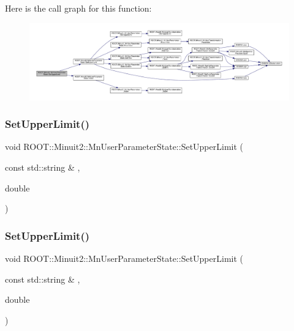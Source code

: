 Here is the call graph for this function\+:
\nopagebreak
\begin{figure}[H]
\begin{center}
\leavevmode
\includegraphics[width=350pt]{d3/de0/classROOT_1_1Minuit2_1_1MnUserParameterState_ab61a4e78b23aa76315662cf9bd07a012_cgraph}
\end{center}
\end{figure}
\mbox{\label{classROOT_1_1Minuit2_1_1MnUserParameterState_ab61a4e78b23aa76315662cf9bd07a012}} 
\subsubsection{\texorpdfstring{SetUpperLimit()}{SetUpperLimit()}\hspace{0.1cm}{\footnotesize\ttfamily [5/6]}}
{\footnotesize\ttfamily void R\+O\+O\+T\+::\+Minuit2\+::\+Mn\+User\+Parameter\+State\+::\+Set\+Upper\+Limit (\begin{DoxyParamCaption}\item[{const std\+::string \&}]{,  }\item[{double}]{ }\end{DoxyParamCaption})}

\mbox{\label{classROOT_1_1Minuit2_1_1MnUserParameterState_ab61a4e78b23aa76315662cf9bd07a012}} 
\subsubsection{\texorpdfstring{SetUpperLimit()}{SetUpperLimit()}\hspace{0.1cm}{\footnotesize\ttfamily [6/6]}}
{\footnotesize\ttfamily void R\+O\+O\+T\+::\+Minuit2\+::\+Mn\+User\+Parameter\+State\+::\+Set\+Upper\+Limit (\begin{DoxyParamCaption}\item[{const std\+::string \&}]{,  }\item[{double}]{ }\end{DoxyParamCaption})}

